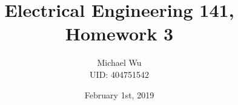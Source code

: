 \documentclass[12pt]{article}
\begin{document}
\title{Electrical Engineering 141, Homework 3}
\date{February 1st, 2019}
\author{Michael Wu\\UID: 404751542}
\maketitle
\end{document}
